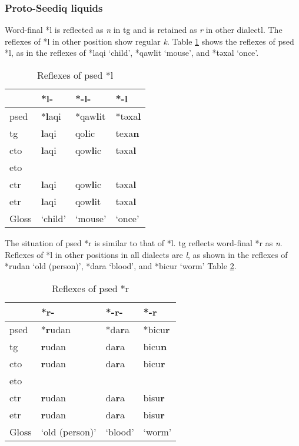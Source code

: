 \subsubsection{Proto-Seediq liquids}

Word-final *l is reflected as \textit{n} in \acl{tg} and is retained as \textit{r} in other dialectl. The reflexes of *l in other position show regular \textit{k}. Table \ref{tab:psed_l} shows the reflexes of \acl{psed} *l, as in the reflexes of *laqi `child', *qawlit `mouse', and *təxal `once'. 

\begin{table}[!htbp]
\centering
\caption{Reflexes of \acl{psed} *l}
\label{tab:psed_l}
\begin{tabular}{llll}
\hline
           & *l-     & *-l-    & *-l    \\ \hline
\acs{psed} & *\textbf{l}aqi   & *qaw\textbf{l}it & *təxa\textbf{l} \\
\acs{tg}   & \textbf{l}aqi    & qo\textbf{l}ic   & texa\textbf{n}  \\
\acs{cto}  & \textbf{l}aqi    & qow\textbf{l}ic  & təxa\textbf{l}  \\
\acs{eto}  &         &         &        \\
\acs{ctr}  & \textbf{l}aqi    & qow\textbf{l}ic  & təxa\textbf{l}  \\
\acs{etr}  & \textbf{l}aqi    & qow\textbf{l}it  & təxa\textbf{l}  \\ \hline
Gloss      & `child' & `mouse' & `once' \\ \hline
\end{tabular}
\end{table}

The situation of \acl{psed} *r is similar to that of *l. \acl{tg} reflects word-final *r as \textit{n}. Reflexes of *l in other positions in all dialects are \textit{l}, as shown in the reflexes of *rudan `old (person)', *dara `blood', and *bicur `worm' Table \ref{tab:psed_r}. 

\begin{table}[!htbp]
\centering
\caption{Reflexes of \acl{psed} *r}
\label{tab:psed_r}
\begin{tabular}{llll}
\hline
           & *r-            & *-r-    & *-r    \\ \hline
\acs{psed} & *\textbf{r}udan         & *da\textbf{r}a   & *bicu\textbf{r} \\ \hdashline
\acs{tg}   & \textbf{r}udan          & da\textbf{r}a    & bicu\textbf{n}  \\
\acs{cto}  & \textbf{r}udan          & da\textbf{r}a    & bicu\textbf{r}  \\
\acs{eto}  &                &         &        \\
\acs{ctr}  & \textbf{r}udan          & da\textbf{r}a    & bisu\textbf{r}  \\
\acs{etr}  & \textbf{r}udan          & da\textbf{r}a    & bisu\textbf{r}  \\ \hline
Gloss      & `old (person)' & `blood' & `worm' \\ \hline
\end{tabular}
\end{table}

